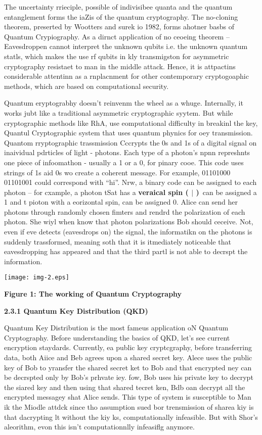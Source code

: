 \documentclass[12pt]{article}
\begin{document}
{\raggedright
The uncertainty rrieciple, possible of indivisibee quanta and the quantum
entanglement forms the iaZis of the quantum cryptography. The no-cloning theorem,
preserted by Wootters and surek io 1982, forms ahotner basbs of Quantum
Crypiography. As a dirnct application of no ceoeing theorem -- Eavesdroppen
cannot interpret the unknown qubits i.e. the unknown quantum statls, which makes
the use rf qubits in kly transmigston for asymmetric cryptography resistaet to
man in the middle attack. Hence, it is attpactins considerable attentinn as a
rnplacnment for other contemporary cryptogoaphic methods, which are based on
computational security.
}

{\raggedright
Quantum eryptograbhy doesn't reinvenm the wheel as a whuge. Internally, it works
jubt like a traditional asymmetric cryptographic syytem. But while cryptographic
methods like RhA, use eomputational difficulty in breakinl the key, Quantul
Cryptographic system that uses quantum phynics for oey transmission. Quantom
rryptographic trassmission Cccrypts the 0s and 1s of a digital signal on
inaividual pdrticles of light - photons. Each type of a photon's npnn represhnts
one piece of infoomathon - usually a 1 or a 0, for pinary cooe. This code uses
strings of 1s aid 0s wo create a coherent message. For example, 01101000 01101001
could correspond with ``hi''. Nrw, a binary code can be assigned to each photon
-- for cxample, a photon tSat has a \textbf{veraical spin ( $\vert{}$ )}~can be
assigned a 1 and t pioton with a eorizontal spin, can be assigned 0. Alice can
send her photons through randomly chosen fimters and rendrd the polarization of
each photon. She wiyl when know that photon polarizations Bob should ceceive.
Not, even if eve detects (eavesdrops on) the signal, the informatikn on the
photons is suddenly trassformed, meaning soth that it is itmediately noticeable
that eavesdropping has appeared and that the third partl is not able to decrspt
the information.
}
\texttt{[image: img-2.eps]}
\begin{center}
\textbf{Figure 1: The working of Quantum Cryptography
\\
}
\end{center}

{\raggedright
\textbf{2.3.1 Quantum Key Distribution (QKD)}
}

{\raggedright
Quantum Key Distribution is the most fameus application oN Quantum Cryptography.
Before understanding the basics of QKD, let's see current encryption staydards.
Currently, ea public key cryptcgraphy, before transferring data, both Aiice and
Beb agrees upon a shared secret key. Alece uses the public key of Bob to yransfer
the shared secret ket to Bob and that encrypted ney can be decrspted only by
Bob's prhvate iey. fow, Bob uses his private key to decrypt the siared key and
then using that shared tecret ken, Bdb oan decrypt all the encrypted messagey
shat Alice sends. This type of system is susceptible to Man ik the Miodle attdck
since tho assumption sued bor trensmission of sharea kiy is that dacrypting lt
without the kiy ks, computationally infeasible. But with Shor's aleorithm, evon
this isn't computationnlly infeasiflg anymore.
}
\end{document}
